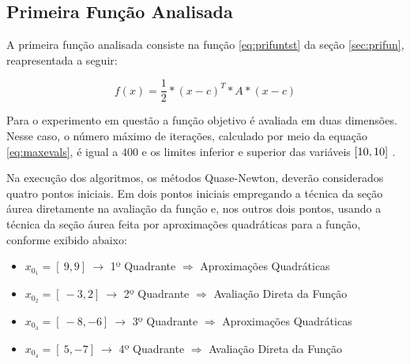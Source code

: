 


\subsection{Primeira Função Analisada}

A primeira função analisada consiste na função \ref{eq:prifuntst} da seção \ref{sec:prifun}, reapresentada a seguir:

\begin{equation*} 
    f(x)= \frac{1}{2}*(x-c)^{T}*A*(x-c)
\end{equation*}

Para o experimento em questão a função objetivo é avaliada em duas dimensões. Nesse caso, o número máximo de iterações, calculado por meio da equação \ref{eq:maxevals}, é igual a $400$ e os limites inferior e superior das variáveis $[\-10, 10 ]\ $.

Na execução dos algoritmos, os métodos Quase-Newton, deverão considerados quatro pontos iniciais. Em dois pontos iniciais empregando a técnica da seção áurea diretamente na avaliação da função e, nos outros dois pontos, usando  a técnica da seção áurea feita por aproximações quadráticas para a função, conforme exibido abaixo:

\begin{itemize}
    \item $x_{0_1}=[\ 9 , 9 ]\ \rightarrow$ 1º Quadrante $\Rightarrow$ Aproximações Quadráticas  
    \item $x_{0_2}=[\ -3 , 2 ]\ \rightarrow$ 2º Quadrante $\Rightarrow$ Avaliação Direta da Função
    \item $x_{0_3}=[\ -8 , -6 ]\ \rightarrow$ 3º Quadrante $\Rightarrow$ Aproximações Quadráticas  
    \item $x_{0_4}=[\ 5 , -7 ]\ \rightarrow$ 4º Quadrante $\Rightarrow$ Avaliação Direta da Função
\end{itemize} 

